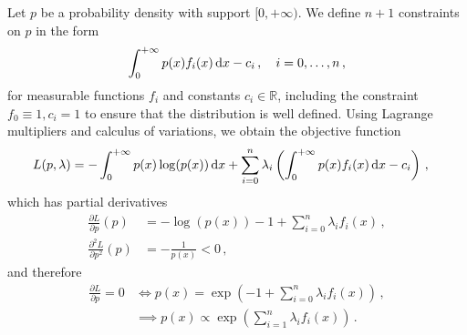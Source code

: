 \documentclass{article}
\newcommand{\R}{\mathbb{R}}
\newcommand{\dd}{{\rm d}}
\begin{document}
%
Let $p$ be a probability density with support $[0, +\infty)$.
We define $n + 1$ constraints on $p$ in the form
%
\begin{align*}
	\int_0^{+\infty} p(x) f_i(x) \, \dd x - c_i \,, \quad i = 0, \dots, n \,,
\end{align*}
%
for measurable functions $f_i$ and constants $c_i \in \R$,
including the constraint $f_0 \equiv 1, c_i = 1$
to ensure that the distribution is well defined.
Using Lagrange multipliers and calculus of variations,
we obtain the objective function
%
\begin{align*}
	L(p, \lambda) &= -\int_0^{+\infty} p(x) \log(p(x)) \, \dd x
		+ \sum_{i=0}^n \lambda_i
		\left(\int_0^{+\infty} p(x) f_i(x) \, \dd x - c_i\right) \,,
\end{align*}
%
which has partial derivatives
%
\begin{align*}
	\frac{\partial L}{\partial p}(p)
		&= -\log (p(x)) - 1 + \sum_{i = 0}^n \lambda_i f_i(x) \,, \\
	\frac{\partial ^ 2 L}{\partial p ^ 2}(p)
		&= -\frac{1}{p(x)} < 0 \,,
\end{align*}
%
and therefore
%
\begin{align}
	\frac{\partial L}{\partial p} = 0 &\iff p(x)
		= \exp\left(-1 + \sum_{i = 0}^n \lambda_i f_i(x)\right)
		\,, \nonumber\\
	&\implies p(x) \propto \exp\left(\sum_{i = 1}^n \lambda_i f_i(x)\right) \,.
	\label{eq:p-prop}
\end{align}
%
\end{document}
